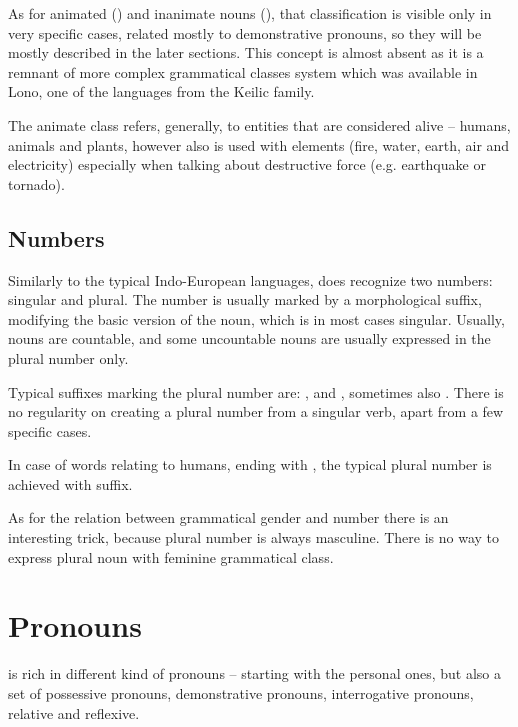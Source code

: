 As for animated (\An{}) and inanimate nouns (\Inan{}), that classification is
visible only in very specific cases, related mostly to demonstrative pronouns,
so they will be mostly described in the later sections. This concept is almost
absent as it is a remnant of more complex grammatical classes system which was
available in Lono, one of the languages from the Keilic family.

The animate class refers, generally, to entities that are considered alive --
humans, animals and plants, however also is used with elements (fire, water,
earth, air and electricity) especially when talking about destructive force
(e.g. earthquake or tornado).

\subsection{Numbers}

Similarly to the typical Indo-European languages, \andro does recognize two
numbers: singular and plural. The number is usually marked by a morphological
suffix, modifying the basic version of the noun, which is in most cases
singular. Usually, nouns are countable, and some uncountable nouns are usually
expressed in the plural number only.


Typical suffixes marking the plural number are: ,  and ,
sometimes also . There is no regularity on creating a plural number from
a singular verb, apart from a few specific cases.

In case of words relating to humans, ending with , the typical plural
number is achieved with  suffix.

As for the relation between grammatical gender and number there is an
interesting trick, because plural number is always masculine. There is no way to
express plural noun with feminine grammatical class.

\section{Pronouns}

\andro is rich in different kind of pronouns -- starting with the personal ones,
but also a set of possessive pronouns, demonstrative pronouns, interrogative
pronouns, relative and reflexive.

